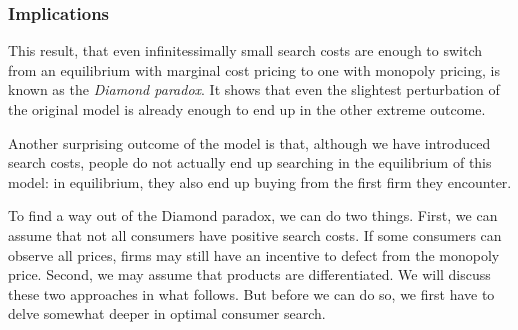 \subsubsection{Implications}
This result, that even infinitessimally small search costs are enough to switch from an
equilibrium with marginal cost pricing to one with monopoly pricing, is known as the
\textit{Diamond paradox}. It shows that even the slightest perturbation of the original model is
already enough to end up in the other extreme outcome.

Another surprising outcome of the model is that, although we have introduced search
costs, people do not actually end up searching in the equilibrium of this model: in
equilibrium, they also end up buying from the first firm they encounter.

To find a way out of the Diamond paradox, we can do two things. First, we can
assume that not all consumers have positive search costs. If some consumers can observe
all prices, firms may still have an incentive to defect from the monopoly price. Second,
we may assume that products are differentiated. We will discuss these two approaches in
what follows. But before we can do so, we first have to delve somewhat deeper in optimal
consumer search.
